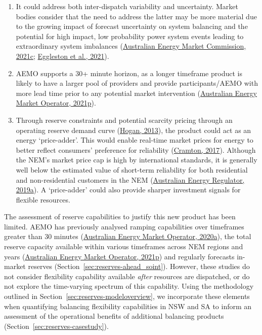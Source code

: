 \documentclass[12pt,a4paper,]{report}
\providecommand{\tightlist}{%
  \setlength{\itemsep}{0pt}\setlength{\parskip}{0pt}}
\begin{document}
\begin{enumerate}
\def\labelenumi{\arabic{enumi}.}
\tightlist
\item
  It could address both inter-dispatch variability and uncertainty.
  Market bodies consider that the need to address the latter may be more
  material due to the growing impact of forecast uncertainty on system
  balancing and the potential for high impact, low probability power
  system events leading to extraordinary system imbalances
  (\protect\hyperlink{ref-australianenergymarketcommissionReserveServicesNational2021}{Australian
  Energy Market Commission, 2021c};
  \protect\hyperlink{ref-egglestonSecurityResilienceTechnical2021}{Eggleston
  et al., 2021}).
\item
  AEMO supports a 30+ minute horizon, as a longer timeframe product is
  likely to have a larger pool of providers and provide
  participants/AEMO with more lead time prior to any potential market
  intervention
  (\protect\hyperlink{ref-australianenergymarketoperatorSubmissionAEMCDirections2021}{Australian
  Energy Market Operator, 2021p}).
\item
  Through reserve constraints and potential scarcity pricing through an
  operating reserve demand curve
  (\protect\hyperlink{ref-hoganElectricityScarcityPricing2013}{Hogan,
  2013}), the product could act as an energy `price-adder'. This would
  enable real-time market prices for energy to better reflect consumers'
  preference for reliability
  (\protect\hyperlink{ref-cramtonElectricityMarketDesign2017}{Cramton,
  2017}). Although the NEM's market price cap is high by international
  standards, it is generally well below the estimated value of
  short-term reliability for both residential and non-residential
  customers in the NEM
  (\protect\hyperlink{ref-australianenergyregulatorValuesCustomerReliability2019}{Australian
  Energy Regulator, 2019a}). A `price-adder' could also provide sharper
  investment signals for flexible resources.
\end{enumerate}

The assessment of reserve capabilities to justify this new product has
been limited. AEMO has previously analysed ramping capabilities over
timeframes greater than 30 minutes
(\protect\hyperlink{ref-australianenergymarketoperatorRenewableIntegrationStudy2020}{Australian
Energy Market Operator, 2020a}), the total reserve capacity available
within various timeframes across NEM regions and years
(\protect\hyperlink{ref-australianenergymarketoperatorSubmissionAEMCDirections2021}{Australian
Energy Market Operator, 2021p}) and regularly forecasts in-market
reserves (Section~\ref{sec:reserves-ahead_soint}). However, these
studies do not consider flexibility capability available \emph{after}
resources are dispatched, or do not explore the time-varying spectrum of
this capability. Using the methodology outlined in
Section~\ref{sec:reserves-modeloverview}, we incorporate these elements
when quantifying balancing flexibility capabilities in NSW and SA to
inform an assessment of the operational benefits of additional balancing
products (Section~\ref{sec:reserves-casestudy}).
\end{document}
